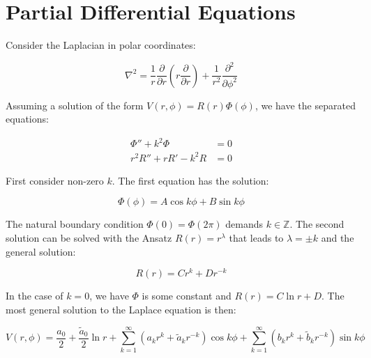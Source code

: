 \documentclass[12pt]{article}
\begin{document}



\pagebreak
\section*{Partial Differential Equations}





Consider the Laplacian in polar coordinates:

\begin{equation}
    \nabla^{2} = \frac{1}{r} \frac{\partial}{\partial r} \left( r \frac{\partial}{\partial r} \right) + \frac{1}{r^{2}} \frac{\partial^{2}}{\partial \phi^{2}}
\end{equation}

Assuming a solution of the form $V(r, \phi) = R(r) \Phi(\phi)$, we have the separated equations:

\begin{equation}
    \begin{split}
        \Phi'' + k^{2} \Phi &= 0 \\
        r^{2} R'' + r R' - k^{2} R &= 0
    \end{split}
\end{equation}

First consider non-zero $k$. The first equation has the solution:

\begin{equation}
    \Phi(\phi) = A \cos{k \phi} + B \sin{k \phi}
\end{equation}

The natural boundary condition $\Phi(0) = \Phi(2 \pi)$ demands $k \in \mathbb{Z}$. The second solution can be solved with the Ansatz $R(r) = r^{\lambda}$ that leads to $\lambda = \pm k$ and the general solution:

\begin{equation}
    R(r) = C r^{k} + D r^{-k}
\end{equation}

In the case of $k = 0$, we have $\Phi$ is some constant and $R(r) = C \ln{r} + D$. The most general solution to the Laplace equation is then:

\begin{equation}
    V(r, \phi) = \frac{a_{0}}{2} + \frac{\tilde{a}_{0}}{2} \ln{r} + \sum_{k = 1}^{\infty} \left( a_{k} r^{k} + \tilde{a}_{k} r^{-k} \right) \cos{k \phi} + \sum_{k = 1}^{\infty} \left( b_{k} r^{k} + \tilde{b}_{k} r^{-k} \right) \sin{k \phi}
\end{equation}
\end{document}
